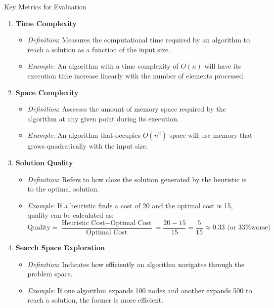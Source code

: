 \documentclass[aspectratio=169]{beamer}
\begin{document}
\begin{frame}[fragile]{Key Metrics for Evaluation}
    \begin{enumerate}
        \item \textbf{Time Complexity}  
        \begin{itemize}
            \item \textit{Definition}: Measures the computational time required by an algorithm to reach a solution as a function of the input size.
            \item \textit{Example}: An algorithm with a time complexity of \( O(n) \) will have its execution time increase linearly with the number of elements processed.
        \end{itemize}
        
        \item \textbf{Space Complexity}  
        \begin{itemize}
            \item \textit{Definition}: Assesses the amount of memory space required by the algorithm at any given point during its execution.
            \item \textit{Example}: An algorithm that occupies \( O(n^2) \) space will use memory that grows quadratically with the input size.
        \end{itemize}
        
        \item \textbf{Solution Quality}  
        \begin{itemize}
            \item \textit{Definition}: Refers to how close the solution generated by the heuristic is to the optimal solution.
            \item \textit{Example}: If a heuristic finds a cost of 20 and the optimal cost is 15, quality can be calculated as:  
            \[
            \text{Quality} = \frac{\text{Heuristic Cost} - \text{Optimal Cost}}{\text{Optimal Cost}} = \frac{20 - 15}{15} = \frac{5}{15} \approx 0.33 \text{ (or 33\% worse)}
            \]
        \end{itemize}

        \item \textbf{Search Space Exploration}  
        \begin{itemize}
            \item \textit{Definition}: Indicates how efficiently an algorithm navigates through the problem space.
            \item \textit{Example}: If one algorithm expands 100 nodes and another expands 500 to reach a solution, the former is more efficient.
        \end{itemize}
    \end{enumerate}
\end{frame}
\end{document}
